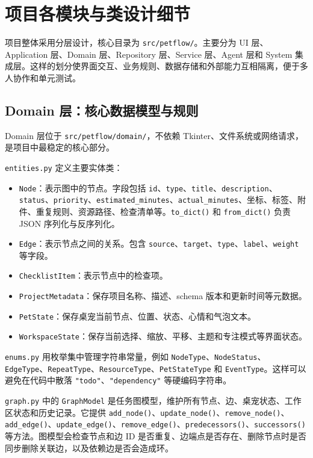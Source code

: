 \documentclass[UTF8,a4paper,12pt,fontset=none]{ctexart}
\begin{document}
\section{项目各模块与类设计细节}

项目整体采用分层设计，核心目录为 \texttt{src/petflow/}。主要分为 UI 层、Application 层、Domain 层、Repository 层、Service 层、Agent 层和 System 集成层。这样的划分使界面交互、业务规则、数据存储和外部能力互相隔离，便于多人协作和单元测试。

\subsection{Domain 层：核心数据模型与规则}

Domain 层位于 \texttt{src/petflow/domain/}，不依赖 Tkinter、文件系统或网络请求，是项目中最稳定的核心部分。

\texttt{entities.py} 定义主要实体类：

\begin{itemize}
  \item \texttt{Node}：表示图中的节点。字段包括 \texttt{id}、\texttt{type}、\texttt{title}、\texttt{description}、\texttt{status}、\texttt{priority}、\texttt{estimated\_minutes}、\texttt{actual\_minutes}、坐标、标签、附件、重复规则、资源路径、检查清单等。\texttt{to\_dict()} 和 \texttt{from\_dict()} 负责 JSON 序列化与反序列化。
  \item \texttt{Edge}：表示节点之间的关系。包含 \texttt{source}、\texttt{target}、\texttt{type}、\texttt{label}、\texttt{weight} 等字段。
  \item \texttt{ChecklistItem}：表示节点中的检查项。
  \item \texttt{ProjectMetadata}：保存项目名称、描述、schema 版本和更新时间等元数据。
  \item \texttt{PetState}：保存桌宠当前节点、位置、状态、心情和气泡文本。
  \item \texttt{WorkspaceState}：保存当前选择、缩放、平移、主题和专注模式等界面状态。
\end{itemize}

\texttt{enums.py} 用枚举集中管理字符串常量，例如 \texttt{NodeType}、\texttt{NodeStatus}、\texttt{EdgeType}、\texttt{RepeatType}、\texttt{ResourceType}、\texttt{PetStateType} 和 \texttt{EventType}。这样可以避免在代码中散落 \texttt{"todo"}、\texttt{"dependency"} 等硬编码字符串。

\texttt{graph.py} 中的 \texttt{GraphModel} 是任务图模型，维护所有节点、边、桌宠状态、工作区状态和历史记录。它提供 \texttt{add\_node()}、\texttt{update\_node()}、\texttt{remove\_node()}、\texttt{add\_edge()}、\texttt{update\_edge()}、\texttt{remove\_edge()}、\texttt{predecessors()}、\texttt{successors()} 等方法。图模型会检查节点和边 ID 是否重复、边端点是否存在、删除节点时是否同步删除关联边，以及依赖边是否会造成环。
\end{document}
